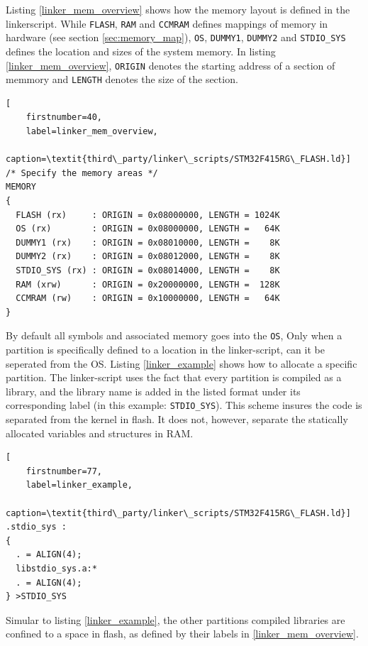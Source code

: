 Listing \ref{linker_mem_overview} shows how the memory layout is defined in the linkerscript.
While \texttt{FLASH}, \texttt{RAM} and \texttt{CCMRAM} defines mappings of memory in hardware (see section \ref{sec:memory_map}),
\texttt{OS}, \texttt{DUMMY1}, \texttt{DUMMY2} and \texttt{STDIO\_SYS} defines the location and sizes of the system memory.
In listing \ref{linker_mem_overview}, \texttt{ORIGIN} denotes the starting address of a section of memmory
and \texttt{LENGTH} denotes the size of the section.\\

\begin{minipage}{\linewidth}
\begin{lstlisting}[
	firstnumber=40,
	label=linker_mem_overview,
	caption=\textit{third\_party/linker\_scripts/STM32F415RG\_FLASH.ld}]
/* Specify the memory areas */
MEMORY
{
  FLASH (rx)     : ORIGIN = 0x08000000, LENGTH = 1024K
  OS (rx)        : ORIGIN = 0x08000000, LENGTH =   64K
  DUMMY1 (rx)    : ORIGIN = 0x08010000, LENGTH =    8K
  DUMMY2 (rx)    : ORIGIN = 0x08012000, LENGTH =    8K
  STDIO_SYS (rx) : ORIGIN = 0x08014000, LENGTH =    8K
  RAM (xrw)      : ORIGIN = 0x20000000, LENGTH =  128K
  CCMRAM (rw)    : ORIGIN = 0x10000000, LENGTH =   64K
}
\end{lstlisting}
\end{minipage}

By default all symbols and associated memory goes into the \texttt{OS},
Only when a partition is specifically defined to a location in the linker-script,
can it be seperated from the OS.
Listing \ref{linker_example} shows how to allocate a specific partition.
The linker-script uses the fact that every partition is compiled as a library,
and the library name is added in the listed format under its corresponding label
(in this example: \texttt{STDIO\_SYS}).
This scheme insures the code is separated from the kernel in flash.
It does not, however, separate the statically allocated variables and structures in RAM.\\

\begin{minipage}{\linewidth}
\begin{lstlisting}[
	firstnumber=77,
	label=linker_example,
	caption=\textit{third\_party/linker\_scripts/STM32F415RG\_FLASH.ld}]
.stdio_sys :
{
  . = ALIGN(4);
  libstdio_sys.a:*
  . = ALIGN(4);
} >STDIO_SYS
\end{lstlisting}
\end{minipage}

Simular to listing \ref{linker_example},
the other partitions compiled libraries are confined to a space in flash,
as defined by their labels in \ref{linker_mem_overview}.

